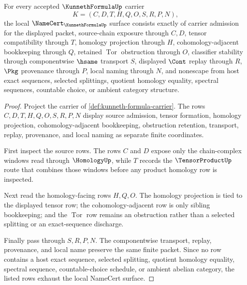 \begin{theorem}
\label{thm:kunneth-formula-obligations}
For every accepted $\KunnethFormulaUp$ carrier
$$
K=(C,D,T,H,Q,O,S,R,P,N),
$$
the local $\NameCert_{\KunnethFormulaUp}$ surface consists exactly of carrier admission for the displayed packet, source-chain exposure through $C,D$, tensor compatibility through $T$, homology projection through $H$, cohomology-adjacent bookkeeping through $Q$, retained $\operatorname{Tor}$ obstruction through $O$, classifier stability through componentwise $\hsame$ transport $S$, displayed $\Cont$ replay through $R$, $\Pkg$ provenance through $P$, local naming through $N$, and nonescape from host exact sequences, selected splittings, quotient homology equality, spectral sequences, countable choice, or ambient category structure.
\end{theorem}
\begin{proof}
Project the carrier of \autoref{def:kunneth-formula-carrier}. The rows $C,D,T,H,Q,O,S,R,P,N$ display source admission, tensor formation, homology projection, cohomology-adjacent bookkeeping, obstruction retention, transport, replay, provenance, and local naming as separate finite coordinates.

First inspect the source rows. The rows $C$ and $D$ expose only the chain-complex windows read through $\HomologyUp$, while $T$ records the $\TensorProductUp$ route that combines those windows before any product homology row is inspected.

Next read the homology-facing rows $H,Q,O$. The homology projection is tied to the displayed tensor row; the cohomology-adjacent row is only sibling bookkeeping; and the $\operatorname{Tor}$ row remains an obstruction rather than a selected splitting or an exact-sequence discharge.

Finally pass through $S,R,P,N$. The componentwise transport, replay, provenance, and local name preserve the same finite packet. Since no row contains a host exact sequence, selected splitting, quotient homology equality, spectral sequence, countable-choice schedule, or ambient abelian category, the listed rows exhaust the local NameCert surface.
\end{proof}


